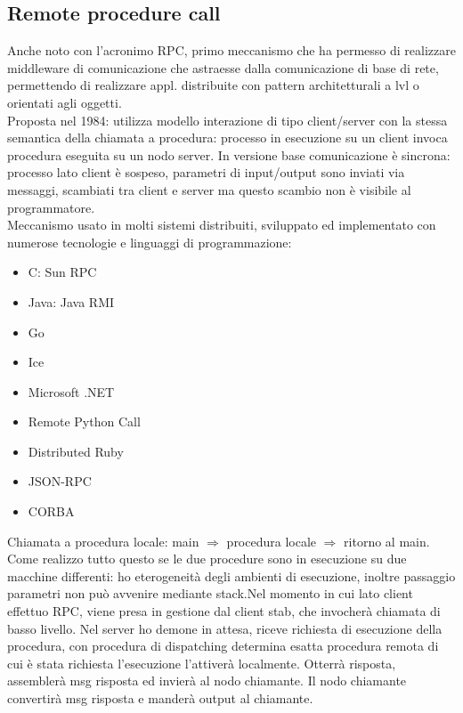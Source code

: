 \documentclass{article}
\begin{document}
\subsection{Remote procedure call}
Anche noto con l'acronimo RPC, primo meccanismo che ha permesso di realizzare middleware di comunicazione che astraesse dalla comunicazione di base di rete, permettendo di realizzare appl. distribuite con pattern architetturali a lvl o orientati agli oggetti.\\ Proposta nel 1984: utilizza modello interazione di tipo client/server con la stessa semantica della chiamata a procedura: processo in esecuzione su un client invoca procedura eseguita su un nodo server. In versione base comunicazione è sincrona: processo lato client è sospeso, parametri di input/output sono inviati via messaggi, scambiati tra client e server ma questo scambio non è visibile al programmatore.\\ Meccanismo usato in molti sistemi distribuiti, sviluppato ed implementato con numerose tecnologie e linguaggi di programmazione:
\begin{itemize}
\item C: Sun RPC
\item Java: Java RMI
\item Go
\item Ice
\item Microsoft .NET
\item Remote Python Call
\item Distributed Ruby
\item JSON-RPC
\item CORBA
\end{itemize}
Chiamata a procedura locale: main $\Longrightarrow$ procedura locale $\Longrightarrow$ ritorno al main.\\ Come realizzo tutto questo se le due procedure sono in esecuzione su due macchine differenti: ho eterogeneità degli ambienti di esecuzione, inoltre passaggio parametri non può avvenire mediante stack.Nel momento in cui lato client effettuo RPC, viene presa in gestione dal client stab, che invocherà chiamata di basso livello. Nel server ho demone in attesa, riceve richiesta di esecuzione della procedura, con procedura di dispatching determina esatta procedura remota di cui è stata richiesta l'esecuzione l'attiverà localmente. Otterrà risposta, assemblerà msg risposta ed invierà al nodo chiamante. Il nodo chiamante convertirà msg risposta e manderà output al chiamante.
\end{document}

